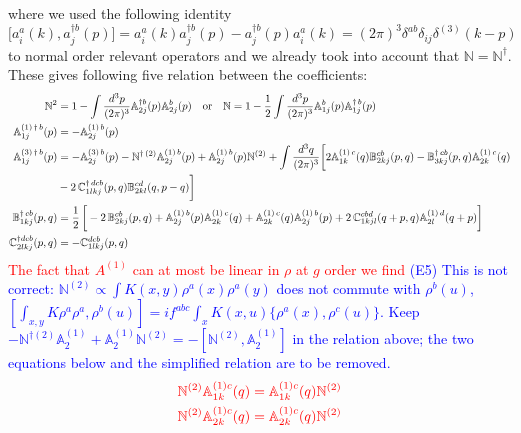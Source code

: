 \documentclass[aps,prd,amsmath,amssymb,nofootinbib]{revtex4-2}
\def\mf#1{\mathbb{#1}}
\numberwithin{equation}{section}
\begin{document}
where we used the following identity
\begin{equation}
    \bigg[a^{a}_{i}(k),a^{\dagger b}_{j}(p)\bigg] = a^{a}_{i}(k)a^{\dagger b}_{j}(p) - a^{\dagger b}_{j}(p)a^{a}_{i}(k)= (2\pi)^{3}\delta^{ab}\delta_{ij}\delta^{(3)}(k-p)
\end{equation}
to normal order relevant operators and we  already took into account that $\mf{N} = \mf{N}^\dagger  $. These gives following five relation between the coefficients: 
\begin{align}
 \mf{N}^{2}  &= 1-  \int \frac{d^{3}p}{(2\pi)^{3}} \mf{A}^{\dagger b}_{2j}(p) \mf{A}^{b}_{2j}(p) \quad
 \text{or} \quad \mf{N}   = 1- \frac{1}{2} \int \frac{d^{3}p}{(2\pi)^{3}} \mf{A}^{b}_{1j}(p) \mf{A}^{\dagger\, b}_{1j}(p) \\ 
 \mf{A}^{(1)\, \dagger\,  b}_{1j}(p) & =  -\mf{A}^{(1)\, b}_{2j}(p) \\  
 \mf{A}^{(3)\, \dagger\, b}_{1j}(p) & = -\mf{A}^{(3)\, b}_{2j}(p)- \mf{N}^{\dagger\, (2)}\mf{A}^{(1)\, b}_{2j}(p) + \mf{A}^{(1)\, b}_{2j}(p)\mf{N}^{(2)} +\int \frac{d^{3}q}{(2\pi)^{3}}\bigg[2\mf{A}^{(1)\, c}_{1k}(q)\mf{B}^{cb}_{2kj}(p,q)-\mf{B}^{\dagger\, cb}_{3kj}(p,q)\mf{A}^{(1)\,c}_{2k}(q)\notag \\ & -2\,\mf{C}^{\dagger\, dcb}_{1lkj}(p,q)\mf{B}^{cd}_{2kl}(q,p-q)\bigg] \\ 
 \mf{B}^{\dagger\, cb}_{1kj}(p,q) & = \frac{1}{2}\,\bigg[-2\,\mf{B}^{cb}_{2kj}(p,q)+\mf{A}^{(1)\, b}_{2j}(p)\mf{A}^{(1)\, c}_{2k}(q)+ \mf{A}^{(1)\, c}_{2k}(q)\mf{A}^{(1)\, b}_{2j}(p)+2\, \mf{C}^{cbd}_{1kjl}(q+p,q)\mf{A}^{(1)\,d}_{2l}(q+p)\bigg]
\\ 
  \mf{C}^{\dagger dcb}_{2lkj}(p,q) & =  -\mf{C}^{dcb}_{1lkj}(p,q)
\end{align}
\textcolor{red}{The fact that $A^{(1)}$ can at most be linear in $\rho$ at $g$ order we find} \textcolor{blue}{(E5) This is not correct: $\mf N^{(2)}\propto\int K(x,y)\rho^a(x)\rho^a(y)$ does not commute with $\rho^b(u)$, $[\int_{x,y}K\rho^a\rho^a,\rho^b(u)]=if^{abc}\int_xK(x,u)\{\rho^a(x),\rho^c(u)\}$. Keep $-\mf N^{\dagger(2)}\mf A^{(1)}_{2}+\mf A^{(1)}_{2}\mf N^{(2)}=-[\mf N^{(2)},\mf A^{(1)}_{2}]$ in the relation above; the two equations below and the simplified relation are to be removed.} 
\begin{align}    \color{red}\mf {N}^{(2)}\mf{A}^{(1)c}_{1k}(q) &\color{red}= \mf{A}^{(1) c}_{1k}(q) \mf {N}^{(2)} \\
    \color{red}\mf {N}^{(2)}\mf{A}^{(1)c}_{2k}(q) &\color{red}= \mf{A}^{(1) c}_{2k}(q) \mf {N}^{(2)}
\end{align}
\end{document}
